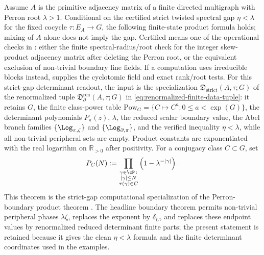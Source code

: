 \begin{theorem}
  \label{thm:class-euler-product-mertens}
  Assume \(A\) is the primitive adjacency matrix of a finite directed
  multigraph with Perron root \(\lambda>1\).  Conditional on the certified
  strict twisted spectral gap \(\eta<\lambda\) for the fixed cocycle
  \(\tau:E_A\to G\), the following finite-state product formula holds; mixing of
  \(A\) alone does not imply the gap.  Certified means one of the operational
  checks in : either the finite
  spectral-radius/root check for the integer skew-product adjacency matrix
  after deleting the Perron root, or the equivalent exclusion of non-trivial
  boundary line fields.  If a computation uses irreducible blocks instead,
   supplies the cyclotomic field and exact
  rank/root tests.  For this strict-gap determinant readout, the input is the specialization
  \(\mathfrak D_{\mathrm{strict}}(A,\tau;G)\) of the renormalized tuple
  \(\mathfrak D_{\partial}^{\mathrm{ren}}(A,\tau;G)\) in
  \eqref{eq:renormalized-finite-data-tuple}: it retains \(G\), the finite
  class-power table \(\mathrm{Pow}_G=\{C\mapsto C^a:0\le a<\exp(G)\}\), the
  determinant polynomials \(P_\pi(z)\), \(\lambda\),
  the reduced scalar boundary value, the Abel branch families
  \(\{\Log_{\pi,\zeta}\}\) and \(\{\Log_{\partial,\pi}\}\), and the verified
  inequality \(\eta<\lambda\),
  while all non-trivial peripheral sets are empty.  Product constants are
  exponentiated with the real logarithm on \(\mathbb R_{>0}\) after positivity.
  For a
  conjugacy class \(C\subset G\), set
  \begin{equation}\label{eq:class-euler-product-def}
    P_C(N):=
    \prod_{\substack{\gamma\in\cP\,:\\ |\gamma|\le N\\
      \tau(\gamma)\in C}}
      \left(1-\lambda^{-|\gamma|}\right).
  \end{equation}
  This theorem is the strict-gap computational specialization of the
  Perron-boundary product theorem
  .
  The headline boundary theorem permits non-trivial peripheral phases
  \(\lambda\zeta\), replaces the exponent by \(\delta_C\), and replaces these
  endpoint values by renormalized reduced determinant finite parts; the present
  statement is retained because it gives the clean \(\eta<\lambda\) formula and
  the finite determinant coordinates used in the examples.

\end{theorem}
